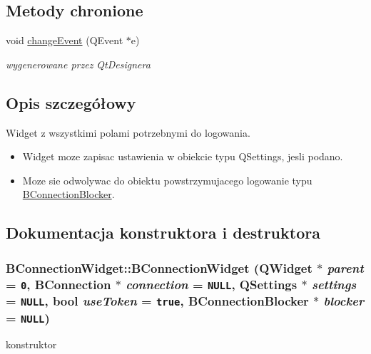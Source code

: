 \subsection*{Metody chronione}
\begin{CompactItemize}
\item 
void \hyperlink{class_b_connection_widget_7396f6332ea7735a6a330fc11927d183}{changeEvent} (QEvent $\ast$e)
\begin{CompactList}\small\item\em wygenerowane przez QtDesignera \item\end{CompactList}\end{CompactItemize}


\subsection{Opis szczegółowy}
Widget z wszystkimi polami potrzebnymi do logowania. 

\begin{itemize}
\item Widget moze zapisac ustawienia w obiekcie typu QSettings, jesli podano. \item Moze sie odwolywac do obiektu powstrzymujacego logowanie typu \hyperlink{class_b_connection_blocker}{BConnectionBlocker}. \end{itemize}


\subsection{Dokumentacja konstruktora i destruktora}
\hypertarget{class_b_connection_widget_f549f688fe132260b6a1333cde59dba7}{
\subsubsection[{BConnectionWidget}]{\setlength{\rightskip}{0pt plus 5cm}BConnectionWidget::BConnectionWidget (QWidget $\ast$ {\em parent} = {\tt 0}, \/  {\bf BConnection} $\ast$ {\em connection} = {\tt NULL}, \/  QSettings $\ast$ {\em settings} = {\tt NULL}, \/  bool {\em useToken} = {\tt true}, \/  {\bf BConnectionBlocker} $\ast$ {\em blocker} = {\tt NULL})}}
\label{class_b_connection_widget_f549f688fe132260b6a1333cde59dba7}


konstruktor 

